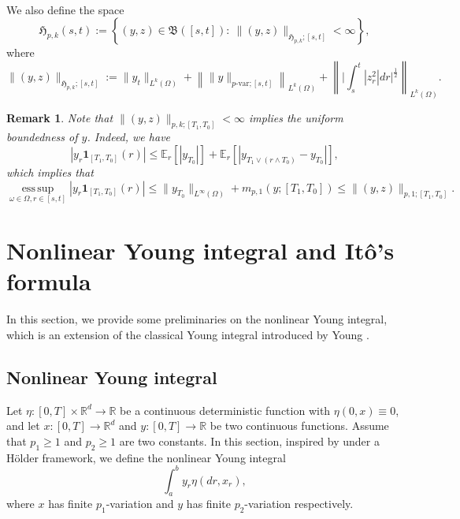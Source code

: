 \documentclass[11pt,reqno]{amsart}
\def\R{\mathbb R}
\newtheorem{remark}{Remark}[section]
\DeclareMathOperator*{\esssup}{ess\,sup}
\numberwithin{equation}{section}
\begin{document}
\begin{itemize}
\begin{equation}
\begin{aligned}
\end{aligned}
\end{equation} 
We also define the space 
\begin{equation*}
\mathfrak{H}_{p,k}(s,t) := \left\{ (y,z)\in\mathfrak{B}([s,t]): \ \|(y,z)\|_{\mathfrak{H}_{p,k};[s,t]} < \infty \right\},
\end{equation*}
where 
\begin{equation}\label{e:Hpk}
\|(y,z)\|_{\mathfrak{H}_{p,k};[s,t]} := \|y_{t}\|_{L^{k}(\Omega)} + \left\|\|y\|_{p\text{-var};[s,t]}\right\|_{L^{k}(\Omega)} + \left\|\Big|\int_{s}^{t}|z^{2}_{r}|dr\Big|^{\frac{1}{2}}\right\|_{L^{k}(\Omega)}.
\end{equation}



\begin{remark}\label{rem:boundedness of y}
Note that $\|(y,z)\|_{p,k;[T_{1},T_{0}]}<\infty$ implies the uniform boundedness of $y$. Indeed, we have
\[|y_{r}\mathbf{1}_{[T_{1},T_{0}]}(r)| \le \mathbb{E}_{r}[|y_{T_{0}}|] + \mathbb{E}_{ r}[|y_{T_{1}\vee(r\land T_{0})} - y_{T_{0}}|],\] 
which implies that\begin{equation}\label{eq:ess-mpk} \esssup\limits_{\omega\in\Omega, r\in[s,t]}|y_{r}\mathbf{1}_{[T_1,T_0]}(r)| \le \|y_{T_0}\|_{L^{\infty}(\Omega)}+m_{p,1}(y;[T_1, T_0])\le \|(y,z)\|_{p,1;[T_1,T_0]}.
\end{equation}
\end{remark}
\end{itemize}





\section{Nonlinear Young integral and It\^o's formula}\label{sec:nonlinear-Y-I}

In this section, we  provide some preliminaries on the nonlinear Young integral, which is an extension of the classical  Young integral introduced by Young \cite{young1936}. 


\subsection{Nonlinear Young integral} \label{sec:Young-integral}

Let $\eta: [0,T]\times \mathbb{R}^{d}\rightarrow \mathbb{R}$ be a continuous deterministic function with $\eta(0,x) \equiv 0$, and let $x:[0,T]\to \R^d$ and $y:[0,T]\to \R$ be two continuous functions. Assume that $p_1\ge 1$ and $p_2\ge 1$ are two constants. In this section, inspired by \cite{HuLe} under a H\"older framework, we define the nonlinear Young integral
\[\int_{a}^{b}y_{r}\eta(dr,x_{r}),\]
where $x$ has finite $p_1$-variation and $y$ has finite $p_2$-variation respectively.
\end{document}
